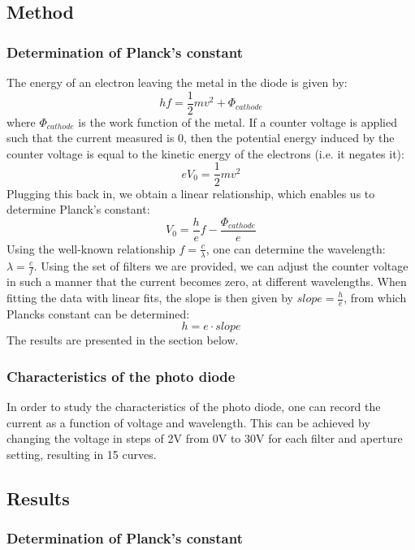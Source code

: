 \documentclass{scrartcl}
\begin{document}

\subsection{Method}

\subsubsection{Determination of Planck's constant}

The energy of an electron leaving the metal in the diode is given by: \[ hf = \frac{1}{2}m v^2 +\Phi_{cathode}\] where $\Phi_{cathode}$ is the work function of the metal. If a counter voltage is applied such that the current measured is 0, then the potential energy induced by the counter voltage is equal to the kinetic energy of the electrons (i.e. it negates it): \[ eV_0 = \frac{1}{2} m v^2\] Plugging this back in, we obtain a linear relationship, which enables us to determine Planck's constant:\begin{equation} V_0 = \frac{h}{e}f - \frac{\Phi_{cathode}}{e} \end{equation} Using the well-known relationship $f = \frac{c}{\lambda}$, one can determine the wavelength: $\lambda = \frac{c}{f}$. Using the set of filters we are provided, we can adjust the counter voltage in such a manner that the current becomes zero, at different wavelengths. When fitting the data with linear fits, the slope is then given by $slope = \frac{h}{e}$, from which Plancks constant can be determined: \[h= e \cdot slope \] The results are presented in the section below. 

\subsubsection{Characteristics of the photo diode}

In order to study the characteristics of the photo diode, one can record the current as a function of voltage and wavelength. This can be achieved by changing the voltage in steps of 2V from 0V to 30V for each filter and aperture setting, resulting in 15 curves. 

\subsection{Results}

\subsubsection{Determination of Planck's constant}
\end{document}
